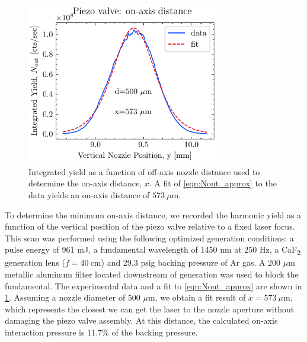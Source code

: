 \begin{figure}
	\centering
	\includegraphics[width=0.75\textwidth]{figures/chap3/piezovalve_vscan.pdf}
	\caption{Integrated yield as a function of off-axis nozzle distance used to determine the on-axis distance, $x$. A fit of \cref{eqn:Nout_approx} to the data yields an on-axis distance of $573 \ \mu \textrm{m}$.}
	\label{fig:piezovalve_vscan}
\end{figure}

To determine the minimum on-axis distance, we recorded the harmonic yield as a function of the vertical position of the piezo valve relative to a fixed laser focus. This scan was performed using the following optimized generation conditions: a pulse energy of 961 mJ, a fundamental wavelength of 1450 nm at 250 Hz, a CaF\textsubscript{2} generation lens ($f = 40 \ \textrm{cm}$) and 29.3 psig backing pressure of Ar gas. A 200 $\mu$m metallic aluminum filter located downstream of generation was used to block the fundamental. The experimental data and a fit to \cref{eqn:Nout_approx} are shown in \cref{fig:piezovalve_vscan}. Assuming a nozzle diameter of 500 $\mu$m, we obtain a fit result of $x = 573 \ \mu\textrm{m}$, which represents the closest we can get the laser to the nozzle aperture without damaging the piezo valve assembly. At this distance, the calculated on-axis interaction pressure is 11.7\% of the backing pressure.

